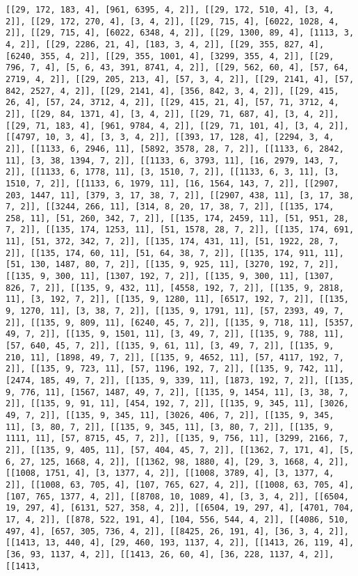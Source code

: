 \documentclass[12pt,fleqn]{article}\usepackage{../../common}
\begin{document}
\begin{verbatim}
[[29, 172, 183, 4], [961, 6395, 4, 2]], [[29, 172, 510, 4], [3, 4, 2]], [[29, 172, 270, 4], [3, 4, 2]], [[29, 715, 4], [6022, 1028, 4, 2]], [[29, 715, 4], [6022, 6348, 4, 2]], [[29, 1300, 89, 4], [1113, 3, 4, 2]], [[29, 2286, 21, 4], [183, 3, 4, 2]], [[29, 355, 827, 4], [6240, 355, 4, 2]], [[29, 355, 1001, 4], [3299, 355, 4, 2]], [[29, 796, 7, 4], [5, 6, 43, 391, 8741, 4, 2]], [[29, 562, 60, 4], [57, 64, 2719, 4, 2]], [[29, 205, 213, 4], [57, 3, 4, 2]], [[29, 2141, 4], [57, 842, 2527, 4, 2]], [[29, 2141, 4], [356, 842, 3, 4, 2]], [[29, 415, 26, 4], [57, 24, 3712, 4, 2]], [[29, 415, 21, 4], [57, 71, 3712, 4, 2]], [[29, 84, 1371, 4], [3, 4, 2]], [[29, 71, 687, 4], [3, 4, 2]], [[29, 71, 183, 4], [961, 9784, 4, 2]], [[29, 71, 101, 4], [3, 4, 2]], [[4797, 10, 3, 4], [3, 3, 4, 2]], [[393, 17, 128, 4], [2294, 3, 4, 2]], [[1133, 6, 2946, 11], [5892, 3578, 28, 7, 2]], [[1133, 6, 2842, 11], [3, 38, 1394, 7, 2]], [[1133, 6, 3793, 11], [16, 2979, 143, 7, 2]], [[1133, 6, 1778, 11], [3, 1510, 7, 2]], [[1133, 6, 3, 11], [3, 1510, 7, 2]], [[1133, 6, 1979, 11], [16, 1564, 143, 7, 2]], [[2907, 203, 1447, 11], [379, 3, 17, 38, 7, 2]], [[2907, 438, 11], [3, 17, 38, 7, 2]], [[3244, 266, 11], [314, 8, 20, 17, 38, 7, 2]], [[135, 174, 258, 11], [51, 260, 342, 7, 2]], [[135, 174, 2459, 11], [51, 951, 28, 7, 2]], [[135, 174, 1253, 11], [51, 1578, 28, 7, 2]], [[135, 174, 691, 11], [51, 372, 342, 7, 2]], [[135, 174, 431, 11], [51, 1922, 28, 7, 2]], [[135, 174, 60, 11], [51, 64, 38, 7, 2]], [[135, 174, 911, 11], [51, 130, 1487, 80, 7, 2]], [[135, 9, 925, 11], [3270, 192, 7, 2]], [[135, 9, 300, 11], [1307, 192, 7, 2]], [[135, 9, 300, 11], [1307, 826, 7, 2]], [[135, 9, 432, 11], [4558, 192, 7, 2]], [[135, 9, 2818, 11], [3, 192, 7, 2]], [[135, 9, 1280, 11], [6517, 192, 7, 2]], [[135, 9, 1270, 11], [3, 38, 7, 2]], [[135, 9, 1791, 11], [57, 2393, 49, 7, 2]], [[135, 9, 809, 11], [6240, 45, 7, 2]], [[135, 9, 718, 11], [5357, 49, 7, 2]], [[135, 9, 1501, 11], [3, 49, 7, 2]], [[135, 9, 788, 11], [57, 640, 45, 7, 2]], [[135, 9, 61, 11], [3, 49, 7, 2]], [[135, 9, 210, 11], [1898, 49, 7, 2]], [[135, 9, 4652, 11], [57, 4117, 192, 7, 2]], [[135, 9, 723, 11], [57, 1196, 192, 7, 2]], [[135, 9, 742, 11], [2474, 185, 49, 7, 2]], [[135, 9, 339, 11], [1873, 192, 7, 2]], [[135, 9, 776, 11], [1567, 1487, 49, 7, 2]], [[135, 9, 1454, 11], [3, 38, 7, 2]], [[135, 9, 91, 11], [454, 192, 7, 2]], [[135, 9, 345, 11], [3026, 49, 7, 2]], [[135, 9, 345, 11], [3026, 406, 7, 2]], [[135, 9, 345, 11], [3, 80, 7, 2]], [[135, 9, 345, 11], [3, 80, 7, 2]], [[135, 9, 1111, 11], [57, 8715, 45, 7, 2]], [[135, 9, 756, 11], [3299, 2166, 7, 2]], [[135, 9, 405, 11], [57, 404, 45, 7, 2]], [[1362, 7, 171, 4], [5, 6, 27, 125, 1668, 4, 2]], [[1362, 98, 1880, 4], [29, 3, 1668, 4, 2]], [[1008, 1751, 4], [3, 1377, 4, 2]], [[1008, 3789, 4], [3, 1377, 4, 2]], [[1008, 63, 705, 4], [107, 765, 627, 4, 2]], [[1008, 63, 705, 4], [107, 765, 1377, 4, 2]], [[8708, 10, 1089, 4], [3, 3, 4, 2]], [[6504, 19, 297, 4], [6131, 527, 358, 4, 2]], [[6504, 19, 297, 4], [4701, 704, 17, 4, 2]], [[878, 522, 191, 4], [104, 556, 544, 4, 2]], [[4086, 510, 497, 4], [657, 305, 736, 4, 2]], [[8425, 26, 191, 4], [36, 3, 4, 2]], [[1413, 13, 440, 4], [29, 460, 193, 1137, 4, 2]], [[1413, 26, 119, 4], [36, 93, 1137, 4, 2]], [[1413, 26, 60, 4], [36, 228, 1137, 4, 2]], [[1413, 
\end{verbatim}
\end{document}
